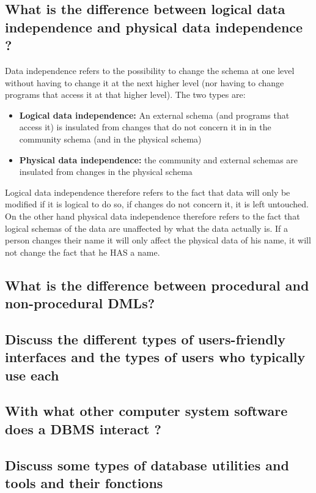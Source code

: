 \subsection{What is the difference between logical data independence and physical data independence ?}
Data independence refers to the possibility to change the schema at one level without having to change it at the next higher level (nor having to change programs that access it at that higher level). The two types are:
\begin{itemize}
	\item \textbf{Logical data independence:} An external schema (and programs that access it) is insulated from changes that do not concern it in in the community schema (and in the physical schema)
	\item \textbf{Physical data independence:} the community and external schemas are insulated from changes in the physical schema
\end{itemize}
Logical data independence therefore refers to the fact that data will only be modified if it is logical to do so, if changes do not concern it, it is left untouched.
On the other hand physical data independence therefore refers to the fact that logical schemas of the data are unaffected by what the data actually is. If a person changes their name it will only affect the physical data of his name, it will not change the fact that he HAS a name.

\subsection{What is the difference between procedural and non-procedural DMLs?}

\subsection{Discuss the different types of users-friendly interfaces and the types of users who typically use each}

\subsection{With what other computer system software does a DBMS interact ?}

\subsection{Discuss some types of database utilities and tools and their fonctions}
